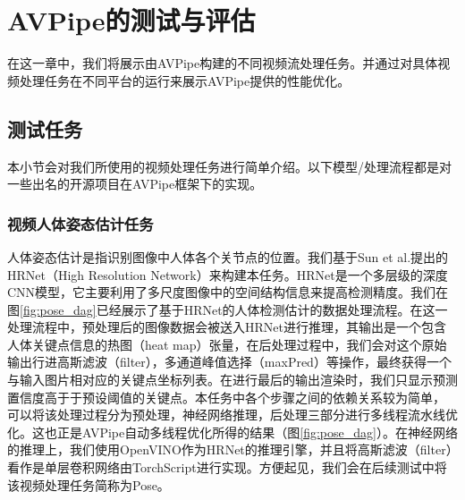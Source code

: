 
\chapter{AVPipe的测试与评估}

在这一章中，我们将展示由AVPipe构建的不同视频流处理任务。并通过对具体视频处理任务在不同平台的运行来展示AVPipe提供的性能优化。

\section{测试任务}
本小节会对我们所使用的视频处理任务进行简单介绍。以下模型/处理流程都是对一些出名的开源项目在AVPipe框架下的实现。

\subsection{视频人体姿态估计任务}
人体姿态估计是指识别图像中人体各个关节点的位置。我们基于Sun et al.提出的HRNet（High Resolution Network）\cite{sun2019deep}来构建本任务。HRNet是一个多层级的深度CNN模型，它主要利用了多尺度图像中的空间结构信息来提高检测精度。我们在图\ref{fig:pose_dag}已经展示了基于HRNet的人体检测估计的数据处理流程。在这一处理流程中，预处理后的图像数据会被送入HRNet进行推理，其输出是一个包含人体关键点信息的热图（heat map）张量，在后处理过程中，我们会对这个原始输出行进高斯滤波（filter），多通道峰值选择（maxPred）等操作，最终获得一个与输入图片相对应的关键点坐标列表。在进行最后的输出渲染时，我们只显示预测置信度高于于预设阈值的关键点。本任务中各个步骤之间的依赖关系较为简单，
可以将该处理过程分为预处理，神经网络推理，后处理三部分进行多线程流水线优化。这也正是AVPipe自动多线程优化所得的结果（图\ref{fig:pose_dag}）。在神经网络的推理上，我们使用OpenVINO作为HRNet的推理引擎，并且将高斯滤波（filter）看作是单层卷积网络由TorchScript进行实现。方便起见，我们会在后续测试中将该视频处理任务简称为Pose。


